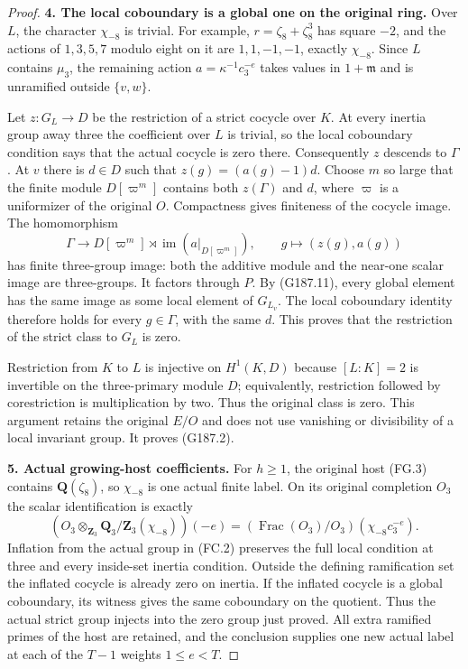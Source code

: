 \begin{proof}
\textbf{4. The local coboundary is a global one on the original ring.}
Over $L$, the character $\chi_{-8}$ is trivial.  For example,
$r=\zeta_8+\zeta_8^3$ has square $-2$, and the actions of
$1,3,5,7$ modulo eight on it are $1,1,-1,-1$, exactly $\chi_{-8}$.
Since $L$ contains $\mu_3$, the remaining action
$a=\kappa^{-1}c_3^{-e}$ takes values in $1+\mathfrak m$ and is
unramified outside $\{v,w\}$.

Let $z:G_L\to D$ be the restriction of a strict cocycle over $K$.
At every inertia group away three the coefficient over $L$ is
trivial, so the local coboundary condition says that the actual
cocycle is zero there.  Consequently $z$ descends to $\Gamma$.
At $v$ there is $d\in D$ such that $z(g)=(a(g)-1)d$.
Choose $m$ so large that the finite module $D[\varpi^m]$ contains
both $z(\Gamma)$ and $d$, where $\varpi$ is a uniformizer of the
original $O$.  Compactness gives finiteness of the cocycle image.
The homomorphism
\[
 \Gamma\longrightarrow
 D[\varpi^m]\rtimes\operatorname{im}(a|_{D[\varpi^m]}),
            \qquad g\longmapsto(z(g),a(g))             \tag{G187.12}
\]
has finite three-group image: both the additive module and the
near-one scalar image are three-groups.  It factors through $P$.
By (G187.11), every global element has the same image as some
local element of $G_{L_v}$.  The local coboundary identity therefore
holds for every $g\in\Gamma$, with the same $d$.  This proves that
the restriction of the strict class to $G_L$ is zero.

Restriction from $K$ to $L$ is injective on $H^1(K,D)$ because
$[L:K]=2$ is invertible on the three-primary module $D$; equivalently,
restriction followed by corestriction is multiplication by two.
Thus the original class is zero.  This argument retains the original
$E/O$ and does not use vanishing or divisibility of a local invariant
group.  It proves (G187.2).

\textbf{5. Actual growing-host coefficients.}
For $h\geq1$, the original host (FG.3) contains $\mathbf Q(\zeta_8)$,
so $\chi_{-8}$ is one actual finite label.  On its original completion
$O_3$ the scalar identification is exactly
\[
 (O_3\otimes_{\mathbf Z_3}\mathbf Q_3/\mathbf Z_3(\chi_{-8}))(-e)
       =(\operatorname{Frac}(O_3)/O_3)(\chi_{-8}c_3^{-e}).
                                                        \tag{G187.13}
\]
Inflation from the actual group in (FC.2) preserves the full local
condition at three and every inside-set inertia condition.  Outside
the defining ramification set the inflated cocycle is already zero
on inertia.  If the inflated cocycle is a global coboundary, its
witness gives the same coboundary on the quotient.  Thus the actual
strict group injects into the zero group just proved.  All extra
ramified primes of the host are retained, and the conclusion supplies
one new actual label at each of the $T-1$ weights $1\leq e<T$.
\end{proof}

